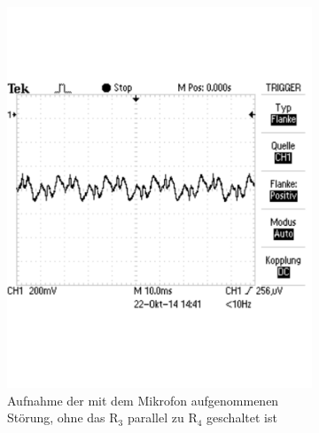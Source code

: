 \documentclass[12pt,a4paper]{article}
\begin{document}
\begin{figure}[H]
        \centering
        \begin{subfigure}[b]{0.48\textwidth}
                \includegraphics[width=\textwidth , scale = 0.4]{2_3_r3np_st.pdf}
				\caption[Aufnahme der mit dem Mikrofon aufgenommenen Störung, ohne das R$_3$ parallel zu R$_4$ geschaltet ist]{Aufnahme der mit dem Mikrofon aufgenommenen Störung, ohne das R$_3$ parallel zu R$_4$ geschaltet ist}
 	 			\label{fig:2_3_r3np_st}
        \end{subfigure}%
        ~ %
        \hfill
        \begin{subfigure}[b]{0.48\textwidth}

\end{subfigure}
\end{figure}
\end{document}
